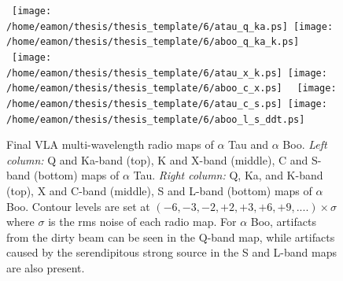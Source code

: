 \begin{figure}[htp]
\centering 
\mbox{
		  \texttt{[image: /home/eamon/thesis/thesis\_template/6/atau\_q\_ka.ps]}
          \texttt{[image: /home/eamon/thesis/thesis\_template/6/aboo\_q\_ka\_k.ps]}
          }
\mbox{
          \texttt{[image: /home/eamon/thesis/thesis\_template/6/atau\_x\_k.ps]}
          \texttt{[image: /home/eamon/thesis/thesis\_template/6/aboo\_c\_x.ps]}
          }
\mbox{
          \texttt{[image: /home/eamon/thesis/thesis\_template/6/atau\_c\_s.ps]}
          \texttt{[image: /home/eamon/thesis/thesis\_template/6/aboo\_l\_s\_ddt.ps]}
          }
\caption[Final VLA multi-wavelength radio maps of $\alpha$ Boo and $\alpha$ Tau.]{Final VLA multi-wavelength radio maps of $\alpha$ Tau and $\alpha$ Boo. \textit{Left column:} Q and Ka-band (top), K and X-band (middle), C and S-band (bottom) maps of $\alpha$ Tau. \textit{Right column:} Q, Ka, and K-band (top), X and C-band (middle), S and L-band (bottom) maps of $\alpha$ Boo. Contour levels are set at $(-6,-3,-2,+2,+3,+6,+9,....)\times \sigma$ where $\sigma$ is the rms noise of each radio map. For $\alpha$ Boo, artifacts from the dirty beam can be seen in the Q-band map, while artifacts caused by the serendipitous strong source in the S and L-band maps are also present.}
\label{fig6.2}
\end{figure}


